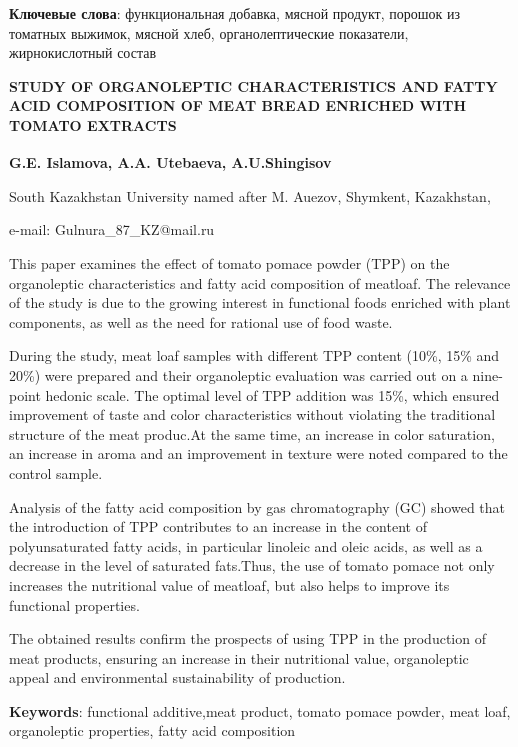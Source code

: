 {\bfseries Ключевые слова}: функциональная добавка, мясной продукт, порошок
из томатных выжимок, мясной хлеб, органолептические показатели,
жирнокислотный состав

\begin{articleheader}
{\bfseries STUDY OF ORGANOLEPTIC CHARACTERISTICS AND FATTY ACID COMPOSITION
OF MEAT BREAD ENRICHED WITH TOMATO EXTRACTS}

{\bfseries
G.E. Islamova\textsuperscript{\envelope },
A.A. Utebaeva,
A.U.Shingisov
}
\end{articleheader}

\begin{affiliation}
South Kazakhstan University named after M. Auezov, Shymkent, Kazakhstan,

e-mail: Gulnura\_87\_KZ@mail.ru
\end{affiliation}

This paper examines the effect of tomato pomace powder (TPP) on the
organoleptic characteristics and fatty acid composition of meatloaf. The
relevance of the study is due to the growing interest in functional
foods enriched with plant components, as well as the need for rational
use of food waste.

During the study, meat loaf samples with different TPP content (10\%,
15\% and 20\%) were prepared and their organoleptic evaluation was
carried out on a nine-point hedonic scale. The optimal level of TPP
addition was 15\%, which ensured improvement of taste and color
characteristics without violating the traditional structure of the meat
produc.At the same time, an increase in color saturation, an increase in
aroma and an improvement in texture were noted compared to the control
sample.

Analysis of the fatty acid composition by gas chromatography (GC) showed
that the introduction of TPP contributes to an increase in the content
of polyunsaturated fatty acids, in particular linoleic and oleic acids,
as well as a decrease in the level of saturated fats.Thus, the use of
tomato pomace not only increases the nutritional value of meatloaf, but
also helps to improve its functional properties.

The obtained results confirm the prospects of using TPP in the
production of meat products, ensuring an increase in their nutritional
value, organoleptic appeal and environmental sustainability of
production.

{\bfseries Keywords}: functional additive,meat product, tomato pomace
powder, meat loaf, organoleptic properties, fatty acid composition

